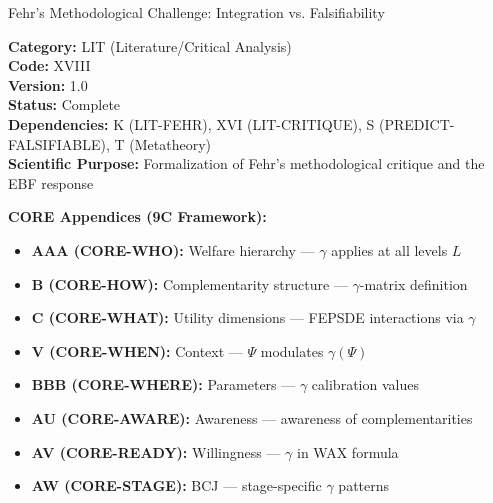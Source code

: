 
\begin{chapter}{Fehr's Methodological Challenge: Integration vs. Falsifiability}
\label{app:lit-fehr-method}

\begin{tcolorbox}[colback=gray!5!white,colframe=gray!75!black]
\small
\textbf{Category:} LIT (Literature/Critical Analysis) \\
\textbf{Code:} XVIII \\
\textbf{Version:} 1.0 \\
\textbf{Status:} Complete \\
\textbf{Dependencies:} K (LIT-FEHR), XVI (LIT-CRITIQUE), S (PREDICT-FALSIFIABLE), T (Metatheory) \\
\textbf{Scientific Purpose:} Formalization of Fehr's methodological critique and the EBF response
\end{tcolorbox}

\begin{tcolorbox}[colback=blue!5!white,colframe=blue!75!black,title=\textbf{Cross-Reference Map}]
\small

\textbf{CORE Appendices (9C Framework):}
\begin{itemize}[noitemsep]
    \item \textbf{AAA (CORE-WHO):} Welfare hierarchy --- $\gamma$ applies at all levels $L$
    \item \textbf{B (CORE-HOW):} Complementarity structure --- $\gamma$-matrix definition
    \item \textbf{C (CORE-WHAT):} Utility dimensions --- FEPSDE interactions via $\gamma$
    \item \textbf{V (CORE-WHEN):} Context --- $\Psi$ modulates $\gamma(\Psi)$
    \item \textbf{BBB (CORE-WHERE):} Parameters --- $\gamma$ calibration values
    \item \textbf{AU (CORE-AWARE):} Awareness --- awareness of complementarities
    \item \textbf{AV (CORE-READY):} Willingness --- $\gamma$ in WAX formula
    \item \textbf{AW (CORE-STAGE):} BCJ --- stage-specific $\gamma$ patterns
\end{itemize}


\end{tcolorbox}
\end{chapter}
